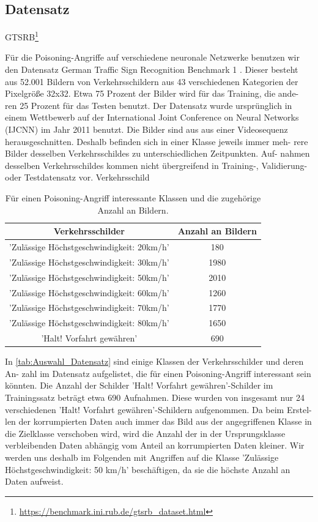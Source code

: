 \documentclass[11pt,a4paper]{article}
\numberwithin{equation}{section}
\begin{document}
	\subsection{Datensatz}
	GTSRB\footnote{\url{https://benchmark.ini.rub.de/gtsrb_dataset.html}}
	
	Für die Poisoning-Angriffe auf verschiedene neuronale Netzwerke benutzen wir
	den Datensatz German Traffic Sign Recognition Benchmark 1 . Dieser besteht
	aus 52.001 Bildern von Verkehrsschildern aus 43 verschiedenen Kategorien der
	Pixelgröße 32x32. Etwa 75 Prozent der Bilder wird für das Training, die ande-
	ren 25 Prozent für das Testen benutzt. Der Datensatz wurde ursprünglich in
	einem Wettbewerb auf der International Joint Conference on Neural Networks
	(IJCNN) im Jahr 2011 benutzt. Die Bilder sind aus aus einer Videosequenz
	herausgeschnitten. Deshalb befinden sich in einer Klasse jeweils immer meh-
	rere Bilder desselben Verkehrsschildes zu unterschiedlichen Zeitpunkten. Auf-
	nahmen desselben Verkehrsschildes kommen nicht übergreifend in Training-,
	Validierung- oder Testdatensatz vor.
	Verkehrsschild
	\begin{table}[h]
		\begin{tabular}[h]{c|c}
			Verkehrsschilder & Anzahl an Bildern \\ \hline
			’Zulässige Höchstgeschwindigkeit: 20km/h’& 180 \\
			’Zulässige Höchstgeschwindigkeit: 30km/h’ & 1980 \\
			’Zulässige Höchstgeschwindigkeit: 50km/h’	& 2010 \\
			’Zulässige Höchstgeschwindigkeit: 60km/h’	& 1260 \\
			’Zulässige Höchstgeschwindigkeit: 70km/h’	& 1770 \\
			’Zulässige Höchstgeschwindigkeit: 80km/h’	&1650 \\
			’Halt! Vorfahrt gewähren’					&	690
		\end{tabular}
		\label{tab:Auswahl_Datensatz}
		\caption{Für einen Poisoning-Angriff interessante Klassen und die zugehörige Anzahl an Bildern.}
	\end{table}
	
	
	
	
	
	
	
	
	In \autoref{tab:Auswahl_Datensatz} sind einige Klassen der Verkehrsschilder und deren An-
	zahl im Datensatz aufgelistet, die für einen Poisoning-Angriff interessant sein
	könnten. Die Anzahl der Schilder ’Halt! Vorfahrt gewähren’-Schilder im Trainingssatz beträgt etwa 690 Aufnahmen. Diese wurden von insgesamt nur 24 verschiedenen ’Halt! Vorfahrt gewähren’-Schildern aufgenommen. Da beim Erstel-
	len der korrumpierten Daten auch immer das Bild aus der angegriffenen Klasse
	in die Zielklasse verschoben wird, wird die Anzahl der in der Ursprungsklasse verbleibenden Daten abhängig vom Anteil an korrumpierten Daten kleiner.
	Wir werden uns deshalb im Folgenden mit Angriffen auf die Klasse ’Zulässige
	Höchstgeschwindigkeit: 50 km/h’ beschäftigen, da sie die höchste Anzahl an
	Daten aufweist.
	
\end{document}
